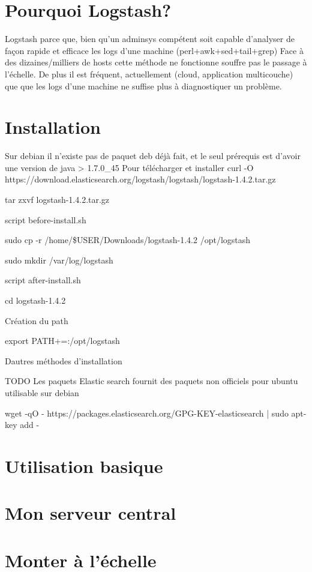 \section{Pourquoi Logstash?}
Logstash parce que, bien qu'un adminsys compétent soit capable d'analyser
de façon rapide et efficace les logs d'une machine (perl+awk+sed+tail+grep)
Face à des dizaines/milliers de hosts cette méthode ne fonctionne souffre pas
le passage à l'échelle.
De plus il est fréquent, actuellement (cloud, application multicouche) que
que les logs d'une machine ne suffise plus à diagnostiquer un problème.

\section{Installation}
Sur debian il n'existe pas de paquet deb déjà fait, et le seul prérequis 
est d'avoir une version de java > 1.7.0\_45
Pour télécharger et installer
curl -O https://download.elasticsearch.org/logstash/logstash/logstash-1.4.2.tar.gz

tar zxvf logstash-1.4.2.tar.gz

script before-install.sh

sudo cp -r /home/\$USER/Downloads/logstash-1.4.2 /opt/logstash

sudo mkdir /var/log/logstash

script after-install.sh

cd logstash-1.4.2


Création du path

export PATH+=:/opt/logstash



Dautres méthodes d'installation

TODO
Les paquets
Elastic search fournit des paquets non officiels pour ubuntu utilisable sur
debian

wget -qO - https://packages.elasticsearch.org/GPG-KEY-elasticsearch | sudo apt-key add -



\section{Utilisation basique}




\section{Mon serveur central}



\section{Monter à l'échelle}
